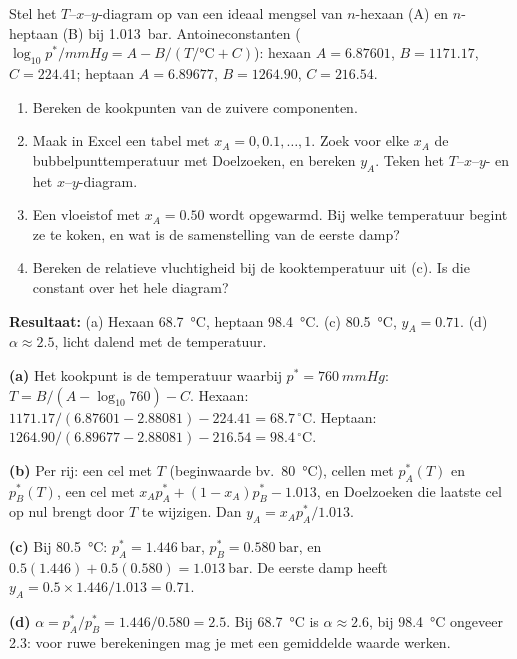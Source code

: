 \begin{oefening}
Stel het $T$--$x$--$y$-diagram op van een ideaal mengsel van $n$-hexaan (A) en $n$-heptaan (B) bij \SI{1.013}{\bar}. Antoineconstanten ($\log_{10} p^*/\si{mmHg} = A - B/(T/\si{\celsius} + C)$): hexaan $A = 6.87601$, $B = 1171.17$, $C = 224.41$; heptaan $A = 6.89677$, $B = 1264.90$, $C = 216.54$.
\begin{enumerate}
\item[(a)] Bereken de kookpunten van de zuivere componenten.
\item[(b)] Maak in Excel een tabel met $x_A = 0, 0.1, \ldots, 1$. Zoek voor elke $x_A$ de bubbelpunttemperatuur met Doelzoeken, en bereken $y_A$. Teken het $T$--$x$--$y$- en het $x$--$y$-diagram.
\item[(c)] Een vloeistof met $x_A = 0.50$ wordt opgewarmd. Bij welke temperatuur begint ze te koken, en wat is de samenstelling van de eerste damp?
\item[(d)] Bereken de relatieve vluchtigheid bij de kooktemperatuur uit (c). Is die constant over het hele diagram?
\end{enumerate}
\end{oefening}
\begin{oplossing}
\textbf{Resultaat:} (a) Hexaan \SI{68.7}{\celsius}, heptaan \SI{98.4}{\celsius}. (c) \SI{80.5}{\celsius}, $y_A = 0.71$. (d) $\alpha \approx 2.5$, licht dalend met de temperatuur.

\textbf{(a)} Het kookpunt is de temperatuur waarbij $p^* = \SI{760}{mmHg}$: $T = B/(A - \log_{10}760) - C$. Hexaan: $1171.17/(6.87601 - 2.88081) - 224.41 = 68.7\,{}^\circ\mathrm{C}$. Heptaan: $1264.90/(6.89677 - 2.88081) - 216.54 = 98.4\,{}^\circ\mathrm{C}$.

\textbf{(b)} Per rij: een cel met $T$ (beginwaarde bv.\ \SI{80}{\celsius}), cellen met $p_A^*(T)$ en $p_B^*(T)$, een cel met $x_A p_A^* + (1-x_A)p_B^* - 1.013$, en Doelzoeken die laatste cel op nul brengt door $T$ te wijzigen. Dan $y_A = x_A p_A^*/1.013$.

\textbf{(c)} Bij \SI{80.5}{\celsius}: $p_A^* = \SI{1.446}{\bar}$, $p_B^* = \SI{0.580}{\bar}$, en $0.5(1.446) + 0.5(0.580) = \SI{1.013}{\bar}$. De eerste damp heeft $y_A = 0.5 \times 1.446/1.013 = 0.71$.

\textbf{(d)} $\alpha = p_A^*/p_B^* = 1.446/0.580 = 2.5$. Bij \SI{68.7}{\celsius} is $\alpha \approx 2.6$, bij \SI{98.4}{\celsius} ongeveer 2.3: voor ruwe berekeningen mag je met een gemiddelde waarde werken.
\end{oplossing}

